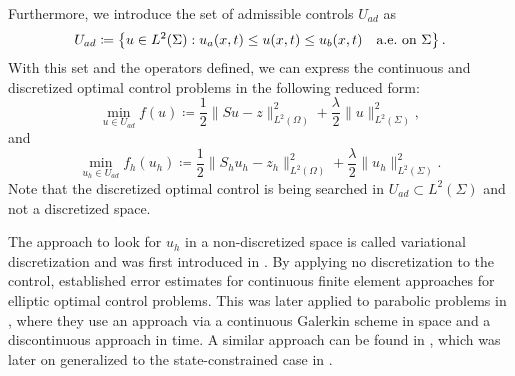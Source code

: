 \documentclass[../thesis.tex]{subfiles}
\begin{document}
Furthermore, we introduce the set of admissible controls $U_{ad}$ as
\[
	U_{ad} \coloneqq \left\{ u \in L^2(\Sigma) \mathrel{}:\mathrel{} u_a(x, t) \leq u(x, t) \leq u_b(x, t) \quad \text{a.e.\ on $\Sigma$} \right\}.
\]
With this set and the operators defined, we can express the continuous and discretized optimal control problems in the following reduced form:
\begin{equation}
\label{eq:f-S}
\min_{u \in U_{ad}} f(u) \coloneqq \frac{1}{2} \| S u - z \|_{L^2(\Omega)}^2 + \frac{\lambda}{2} \| u \|_{L^2(\Sigma)}^2,
\end{equation}
and
\begin{equation}
\label{eq:f-Sh}
\min_{u_h \in U_{ad}} f_h(u_h) \coloneqq \frac{1}{2} \| S_h u_h - z_h \|_{L^2(\Omega)}^2 + \frac{\lambda}{2} \| u_h \|_{L^2(\Sigma)}^2.
\end{equation}
Note that the discretized optimal control is being searched in $U_{ad} \subset L^2(\Sigma)$ and not a discretized space.

The approach to look for $u_h$ in a non-discretized space is called variational discretization and was first introduced in \cite{Hinze}.
By applying no discretization to the control, \cite{Hinze} established error estimates for continuous finite element approaches for elliptic optimal control problems. This was later applied to parabolic problems in \cite{DeckelnickHinze}, where they use an approach via a continuous Galerkin scheme in space and a discontinuous approach in time. A similar approach can be found in \cite{MeidnerVexler-I}, which was later on generalized to the state-constrained case in \cite{MeidnerVexler-II}.
\end{document}

